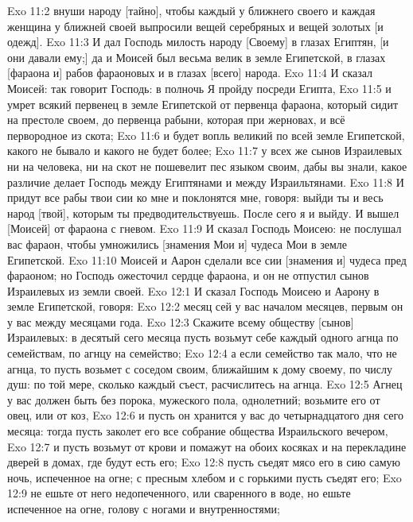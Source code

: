 \vs Exo 11:2 внуши народу [тайно], чтобы каждый у ближнего своего и каждая женщина у ближней своей выпросили вещей серебряных и вещей золотых [и одежд].
\vs Exo 11:3 И дал Господь милость народу [Своему] в глазах Египтян, [и они давали ему;] да и Моисей был весьма велик в земле Египетской, в глазах [фараона и] рабов фараоновых и в глазах [всего] народа.
\vs Exo 11:4 И сказал Моисей: так говорит Господь: в полночь Я пройду посреди Египта,
\vs Exo 11:5 и умрет всякий первенец в земле Египетской от первенца фараона, который сидит на престоле своем, до первенца рабыни, которая при жерновах, и всё первородное из скота;
\vs Exo 11:6 и будет вопль великий по всей земле Египетской, какого не бывало и какого не будет более;
\vs Exo 11:7 у всех же сынов Израилевых ни на человека, ни на скот не пошевелит пес языком своим, дабы вы знали, какое различие делает Господь между Египтянами и между Израильтянами.
\vs Exo 11:8 И придут все рабы твои сии ко мне и поклонятся мне, говоря: выйди ты и весь народ [твой], которым ты предводительствуешь. После сего я и выйду. И вышел [Моисей] от фараона с гневом.
\rsbpar\vs Exo 11:9 И сказал Господь Моисею: не послушал вас фараон, чтобы умножились [знамения Мои и] чудеса Мои в земле Египетской.
\vs Exo 11:10 Моисей и Аарон сделали все сии [знамения и] чудеса пред фараоном; но Господь ожесточил сердце фараона, и он не отпустил сынов Израилевых из земли своей.
\vs Exo 12:1 И сказал Господь Моисею и Аарону в земле Египетской, говоря:
\vs Exo 12:2 месяц сей  у вас началом месяцев, первым  он у вас между месяцами года.
\vs Exo 12:3 Скажите всему обществу [сынов] Израилевых: в десятый  сего месяца пусть возьмут себе каждый одного агнца по семействам, по агнцу на семейство;
\vs Exo 12:4 а если семейство так мало, что не  агнца, то пусть возьмет с соседом своим, ближайшим к дому своему, по числу душ: по той мере, сколько каждый съест, расчислитесь на агнца.
\vs Exo 12:5 Агнец у вас должен быть без порока, мужеского пола, однолетний; возьмите его от овец, или от коз,
\vs Exo 12:6 и пусть он хранится у вас до четырнадцатого дня сего месяца: тогда пусть заколет его все собрание общества Израильского вечером,
\vs Exo 12:7 и пусть возьмут от крови  и помажут на обоих косяках и на перекладине дверей в домах, где будут есть его;
\vs Exo 12:8 пусть съедят мясо его в сию самую ночь, испеченное на огне; с пресным хлебом и с горькими  пусть съедят его;
\vs Exo 12:9 не ешьте от него недопеченного, или сваренного в воде, но ешьте испеченное на огне, голову с ногами и внутренностями;
